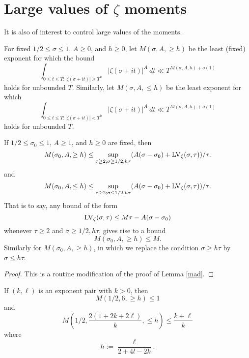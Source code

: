 \section{Large values of \texorpdfstring{$\zeta$}{zeta} moments}

It is also of interest to control large values of the moments.

\begin{definition}\label{mixed-moment-def}
    For fixed $1/2 \leq \sigma \leq 1$, $A \geq 0$, and $h \geq 0$, let $M(\sigma,A, \geq h)$ be the least (fixed) exponent for which the bound
$$ \int_{0 \leq t \leq T: |\zeta(\sigma+it)| \geq T^h} |\zeta(\sigma+it)|^A\ dt \ll T^{M(\sigma,A,h)+o(1)}$$
holds for unbounded $T$.
Similarly, let $M(\sigma,A,\leq h)$ be the least exponent for which
$$ \int_{0 \leq t \leq T: |\zeta(\sigma+it)| < T^h} |\zeta(\sigma+it)|^A\ dt \ll T^{M(\sigma,A,h)+o(1)}$$
holds for unbounded $T$.
\end{definition}

\begin{lemma}\label{mad-variant}  If $1/2 \leq \sigma_0 \leq 1$, $A \geq 1$, and $h \geq 0$ are fixed, then
    \begin{equation}\label{msah}
        M(\sigma_0,A,\geq h) \leq \sup_{\tau \geq 2; \sigma \geq 1/2, h\tau} (A(\sigma-\sigma_0) + \mathrm{LV}_\zeta(\sigma,\tau))/\tau.
    \end{equation}
and
\begin{equation}\label{msah-2}
    M(\sigma_0,A,\leq h) \leq \sup_{\tau \geq 2; \sigma \leq 1/2, h\tau} (A(\sigma-\sigma_0) + \mathrm{LV}_\zeta(\sigma,\tau))/\tau.
\end{equation}
That is to say, any bound of the form
$$ \mathrm{LV}_\zeta(\sigma,\tau) \leq M \tau - A (\sigma - \sigma_0)$$
whenever $\tau \geq 2$ and $\sigma \geq 1/2, h\tau$, gives rise to a bound
$$ M(\sigma_0,A,\geq h) \leq M.$$
Similarly for $M(\sigma_0,A,\geq h)$, in which we replace the condition $\sigma \geq h\tau$ by $\sigma \leq h\tau$.
\end{lemma}

\begin{proof} This is a routine modification of the proof of Lemma \ref{mad}.
\end{proof}

\begin{corollary}\label{ivic-split}  If $(k,\ell)$ is an exponent pair with $k > 0$, then
    $$ M(1/2,6, \geq h) \leq 1$$
and
$$ M\left(1/2,\frac{2(1+2k+2\ell)}{k}, \leq h\right) \leq \frac{k+\ell}{k}$$
where
$$ h := \frac{\ell}{2+4l-2k}.$$
\end{corollary}

